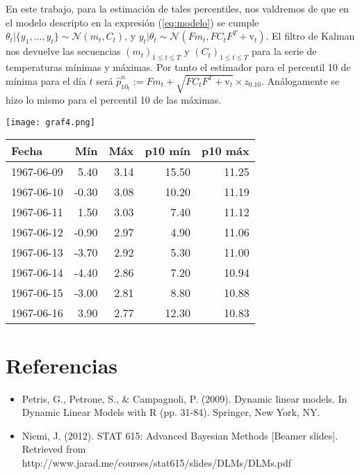 \documentclass{article}\usepackage[]{graphicx}\usepackage[]{color}
\begin{document}
En este trabajo, para la estimación de tales percentiles, nos valdremos de que en el modelo descripto en la expresión (\ref{eq:modelo}) se cumple $\theta_t | \{y_1,\dots,y_t\} \sim \mathcal{N}(m_t,C_t)$, y $y_t|\theta_t \sim \mathcal{N}(Fm_t,FC_tF^T + \text{v}_t)$. El filtro de Kalman nos devuelve las secuencias $(m_t)_{1\leq t \leq T}$ y $(C_t)_{1\leq t \leq T}$ para la serie de temperaturas mínimas y máximas. Por tanto el estimador para el percentil 10 de mínima para el día $t$ será $\hat{p}^n_{10_t}:=Fm_t+\sqrt{FC_tF^T + \text{v}_t}\times z_{0.10}$. Análogamente se hizo lo mismo para el percentil 10 de las máximas.

\begin{center}
\texttt{[image: graf4.png]}
\label{fig:graf4}
\end{center}

\begin{scriptsize}
\begin{center}
\begin{tabular}{lrrrr}
  \hline
Fecha & Mín & Máx & p10 mín & p10 máx \\ 
  \hline
1967-06-09 & 5.40 & 3.14 & 15.50 & 11.25 \\ 
  1967-06-10 & -0.30 & 3.08 & 10.20 & 11.19 \\ 
  1967-06-11 & 1.50 & 3.03 & 7.40 & 11.12 \\ 
  1967-06-12 & -0.90 & 2.97 & 4.90 & 11.06 \\ 
  1967-06-13 & -3.70 & 2.92 & 5.30 & 11.00 \\ 
  1967-06-14 & -4.40 & 2.86 & 7.20 & 10.94 \\ 
  1967-06-15 & -3.00 & 2.81 & 8.80 & 10.88 \\ 
  1967-06-16 & 3.90 & 2.77 & 12.30 & 10.83 \\ 
   \hline
\end{tabular}
\end{center}
\end{scriptsize}

\section{Referencias}

\begin{itemize}
\item Petris, G., Petrone, S., \& Campagnoli, P. (2009). Dynamic linear models. In Dynamic Linear Models with R (pp. 31-84). Springer, New York, NY.

\item Niemi, J. (2012). STAT 615: Advanced Bayesian Methods [Beamer slides]. Retrieved from http://www.jarad.me/courses/stat615/slides/DLMs/DLMs.pdf

\end{itemize}
\end{document}

